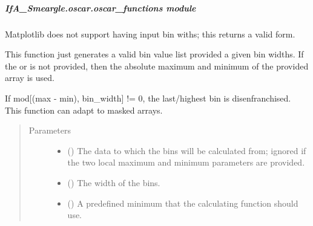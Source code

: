 \documentclass[letterpaper,10pt,english]{sphinxmanual}
\begin{document}
\subparagraph{IfA\_Smeargle.oscar.oscar\_functions module}
\label{\detokenize{python_docstrings/IfA_Smeargle.oscar.oscar_functions:module-IfA_Smeargle.oscar.oscar_functions}}\label{\detokenize{python_docstrings/IfA_Smeargle.oscar.oscar_functions:ifa-smeargle-oscar-oscar-functions-module}}\label{\detokenize{python_docstrings/IfA_Smeargle.oscar.oscar_functions::doc}}

\begin{fulllineitems}
\label{\detokenize{python_docstrings/IfA_Smeargle.oscar.oscar_functions:IfA_Smeargle.oscar.oscar_functions.oscar_bin_width}}
Matplotlib does not support having input bin withs; this returns a
valid form.

This function just generates a valid bin value list provided a given
bin widths. If the  or  is not
provided, then the absolute maximum and minimum of the provided array is
used.

If mod{[}(max - min), bin\_width{]} != 0, the last/highest bin is
disenfranchised. This function can adapt to masked arrays.
\begin{quote}\begin{description}
\item[{Parameters}] \leavevmode\begin{itemize}
\item {} 
 () \textendash{} The data to which the bins will be calculated from; ignored if the two
local maximum and minimum parameters are provided.

\item {} 
 () \textendash{} The width of the bins.

\item {} 
 (\sphinxstyleliteralemphasis{\sphinxupquote{ (}}\sphinxstyleliteralemphasis{\sphinxupquote{)}}) \textendash{} A predefined minimum that the calculating function should use.


\end{itemize}
\end{description}
\end{quote}
\end{fulllineitems}
\end{document}
